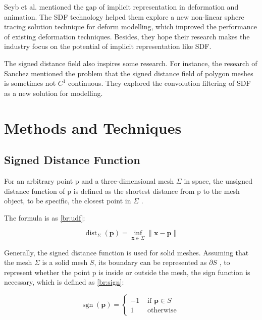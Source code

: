 \hspace*{\fill}

Seyb et al. \cite{nlinearspheretracing} mentioned the gap of implicit representation in deformation and animation. The SDF technology helped them explore a new non-linear sphere tracing solution technique for deform modelling, which improved the performance of existing deformation techniques. Besides, they hope their research makes the industry focus on the potential of implicit representation like SDF.

\hspace*{\fill}

The signed distance field also inspires some research. For instance, the research of Sanchez \cite{convolution} mentioned the problem that the signed distance field of polygon meshes is sometimes not $ C^{1} $ continuous. They explored the convolution filtering of SDF as a new solution for modelling.

\section{Methods and Techniques}

\subsection{Signed Distance Function}
For an arbitrary point p and a three-dimensional mesh $\Sigma$ in space, the unsigned distance function of p is defined as the shortest distance from p to the mesh object, to be specific, the closest point in $\Sigma$ \cite{SDFSurvey}.

\hspace*{\fill}

The formula is as \ref{br:udf}:

\begin{equation}
    \operatorname{dist}_{\Sigma}(\mathbf{p}) = \inf _{\mathbf{x} \in \Sigma}\|\mathbf{x}-\mathbf{p}\|
    \label{br:udf}
\end{equation}

Generally, the signed distance function is used for solid meshes. Assuming that the mesh $\Sigma$ is a solid mesh $ S $, its boundary can be represented as $ \partial S $ \cite{SDFSurvey}, to represent whether the point p is inside or outside the mesh, the sign function is necessary, which is defined as \ref{br:sign}:

\begin{equation}
    \operatorname{sgn}(\mathbf{p}) = \left\{\begin{array}{cl}
        -1 & \text { if } \mathbf{p} \in S \\
        1 & \text { otherwise }
        \end{array}\right.
    \label{br:sign}
\end{equation}

